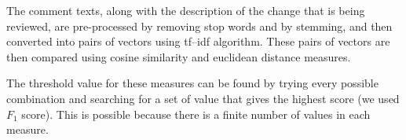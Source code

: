 \documentclass[conference]{IEEEtran}
\begin{document}
The comment texts,
along with the description of the change that is being reviewed,
are pre-processed by removing stop words and by stemming,
and then converted into pairs of vectors using tf--idf algorithm.
These pairs of vectors are then compared using cosine similarity and euclidean distance measures.

The threshold value for these measures can be found
by trying every possible combination
and searching for a set of value that gives the highest score (we used $F_1$ score).
This is possible because there is a finite number of values in each measure.











\IEEEpeerreviewmaketitle



%



\end{document}
